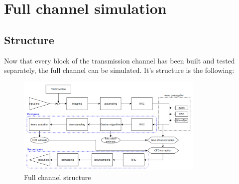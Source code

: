 \documentclass[10pt,a4paper]{ULBreport}
\begin{document}
 









\chapter{Full channel simulation}

\section{Structure}
Now that every block of the transmission channel has been built and tested separately, the full channel can be simulated. It's structure is the following:
\begin{figure}[H]
    \centering
    \includegraphics[width=0.8\textwidth]{pic/Full_channel.png}
    \caption{Full channel structure}
    \label{fig:full_channel}
\end{figure}
\end{document}
